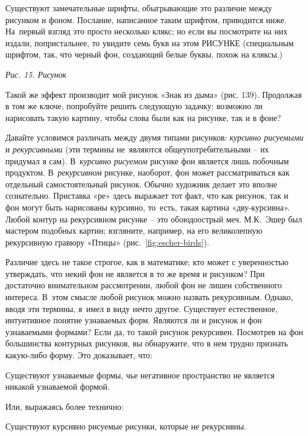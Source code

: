 \documentclass[../main.tex]{subfiles}
\begin{document}
Существуют замечательные шрифты, обыгрывающие это различие между рисунком и фоном. Послание, написанное таким шрифтом, приводится ниже. На~первый взгляд это просто несколько клякс; но если вы посмотрите на них издали, попристальнее, то увидите семь букв на этом РИСУНКЕ (специальным шрифтом, так, что черный фон, создающий белые буквы, похож на кляксы.)

\emph{Рис. 15. Рисунок}

Такой же эффект производит мой рисунок «Знак из дыма» (рис. 139). Продолжая в том же ключе, попробуйте решить следующую задачку: возможно ли нарисовать такую картину, чтобы слова были как на рисунке, так и в фоне?

Давайте условимся различать между двумя типами рисунков: \emph{курсивно рисуемыми} и \emph{рекурсивными} (эти термины не~являются общеупотребительными \--- их придумал я сам). В~\emph{курсивно рисуемом} рисунке фон является лишь побочным продуктом. В~\emph{рекурсивном} рисунке, наоборот, фон может рассматриваться как отдельный самостоятельный рисунок. Обычно художник делает это вполне сознательно. Приставка «ре» здесь выражает тот факт, что как рисунок, так и фон могут быть нарисованы курсивно, то~есть, такая картина «дву-курсивна». Любой контур на рекурсивном рисунке \--- это обоюдоострый меч. М.К.~Эшер был мастером подобных картин; взгляните, например, на его великолепную рекурсивную гравюру «Птицы» (рис.~\ref{fig:escher-birds}).


Различие здесь не такое строгое, как в математике; кто может с уверенностью утверждать, что некий фон не является в то же время и рисунком? При достаточно внимательном рассмотрении, любой фон не лишен собственного интереса. В~этом смысле любой рисунок можно назвать рекурсивным. Однако, вводя эти термины, я~имел в виду нечто другое. Существует естественное, интуитивное понятие узнаваемых форм. Являются ли и рисунок и фон узнаваемыми формами? Если да, то такой рисунок рекурсивен. Посмотрев на фон большинства контурных рисунков, вы обнаружите, что в нем трудно признать какую-либо форму. Это доказывает, что:
%
\begin{block}
    Существуют узнаваемые формы, чье негативное пространство не является никакой узнаваемой формой.
\end{block}
%
Или, выражаясь более технично:
%
\begin{block}
    Существуют курсивно рисуемые рисунки, которые не рекурсивны.
\end{block}
\end{document}
